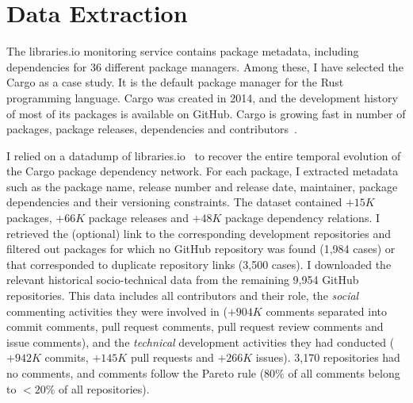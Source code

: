 \section{Data Extraction}

The \textsf{libraries.io} monitoring service contains package metadata, including dependencies for 36 different package managers.
Among these, I have selected the Cargo as a case study. It is the default package manager for %
the Rust programming language. Cargo was created in 2014, and the development history of most of its packages is available on GitHub. 
Cargo is growing fast in number of packages, package releases, dependencies and contributors~\cite{Decan2019EMSE}. 

I relied on a datadump of \textsf{libraries.io}~\cite{Katz2018} to recover the entire temporal evolution of the Cargo package dependency network. 
For each package, I extracted metadata such as the package name, release number and release date, maintainer, package dependencies and their versioning constraints. 
The dataset contained $+15K$ packages, $+66K$ package releases and $+48K$ package dependency relations.
I retrieved the (optional) link to the corresponding development repositories and filtered out packages for which no GitHub repository was found (1,984 cases) %
or that corresponded to duplicate repository links (3,500 cases).
I downloaded the relevant historical socio-technical data from the remaining 9,954 GitHub repositories.
This data includes all contributors and their role, the \emph{social} commenting activities they were involved in ($+904K$ comments separated into commit comments, pull request comments, pull request review comments and issue comments), and the \emph{technical} development activities they had conducted ($+942K$ commits, $+145K$ pull requests and $+266K$ issues).
3,170 repositories had no comments, and comments follow the Pareto rule ($80\%$ of all comments belong to $<20\%$ of all repositories).